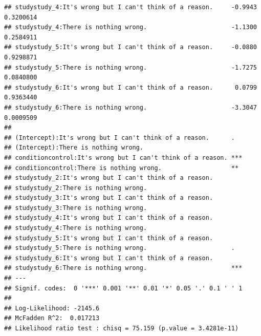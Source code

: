 \documentclass[
  american,
  man,floatsintext]{apa7}
\begin{document}
\begin{verbatim}
## studystudy_4:It's wrong but I can't think of a reason.     -0.9943 0.3200614
## studystudy_4:There is nothing wrong.                       -1.1300 0.2584911
## studystudy_5:It's wrong but I can't think of a reason.     -0.0880 0.9298871
## studystudy_5:There is nothing wrong.                       -1.7275 0.0840800
## studystudy_6:It's wrong but I can't think of a reason.      0.0799 0.9363440
## studystudy_6:There is nothing wrong.                       -3.3047 0.0009509
##                                                               
## (Intercept):It's wrong but I can't think of a reason.      .  
## (Intercept):There is nothing wrong.                           
## conditioncontrol:It's wrong but I can't think of a reason. ***
## conditioncontrol:There is nothing wrong.                   ** 
## studystudy_2:It's wrong but I can't think of a reason.        
## studystudy_2:There is nothing wrong.                          
## studystudy_3:It's wrong but I can't think of a reason.        
## studystudy_3:There is nothing wrong.                          
## studystudy_4:It's wrong but I can't think of a reason.        
## studystudy_4:There is nothing wrong.                          
## studystudy_5:It's wrong but I can't think of a reason.        
## studystudy_5:There is nothing wrong.                       .  
## studystudy_6:It's wrong but I can't think of a reason.        
## studystudy_6:There is nothing wrong.                       ***
## ---
## Signif. codes:  0 '***' 0.001 '**' 0.01 '*' 0.05 '.' 0.1 ' ' 1
## 
## Log-Likelihood: -2145.6
## McFadden R^2:  0.017213 
## Likelihood ratio test : chisq = 75.159 (p.value = 3.4281e-11)
\end{verbatim}
\end{document}
